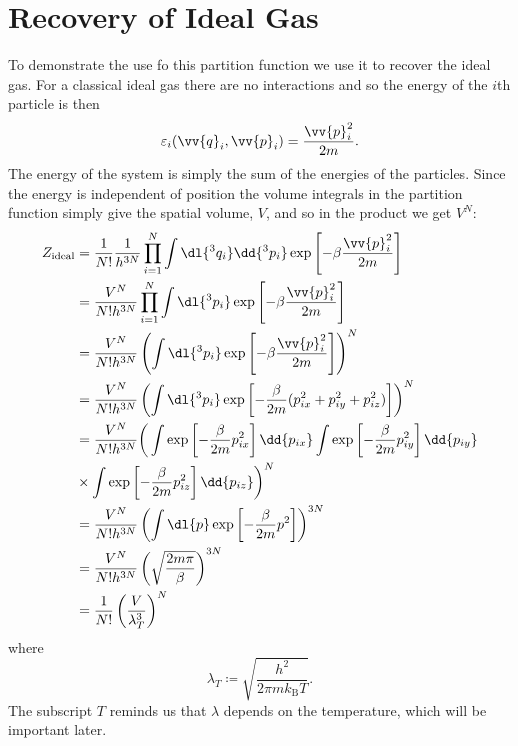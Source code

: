 \documentclass[fleqn]{NotesClass}
\newcommand*{\boltzmann}{k_{\mathrm{B}}}
\begin{document}
    \section{Recovery of Ideal Gas}
    To demonstrate the use fo this partition function we use it to recover the ideal gas.
    For a classical ideal gas there are no interactions and so the energy of the \(i\)th particle is then
    \begin{equation}
        \varepsilon_i(\vv{q}_i, \vv{p}_i) = \frac{\vv{p}_i^2}{2m}.
    \end{equation}
    The energy of the system is simply the sum of the energies of the particles.
    Since the energy is independent of position the volume integrals in the partition function simply give the spatial volume, \(V\), and so in the product we get \(V^N\):
    \begin{align}
        Z_{\mathrm{ideal}} &= \frac{1}{N!} \frac{1}{h^{3N}} \prod_{i = 1}^{N} \int \dl{^3q_i} \dd{^3p_i} \exp\left[ -\beta\frac{\vv{p}_i^2}{2m} \right]\\
        &= \frac{V^N}{N! h^{3N}} \prod_{i = 1}^{N} \int \dl{^3p_i} \exp\left[ -\beta\frac{\vv{p}_i^2}{2m} \right]\\
        &= \frac{V^N}{N! h^{3N}} \left( \int \dl{^3p_i} \exp\left[ -\beta\frac{\vv{p}_i^2}{2m} \right] \right)^N\\
        &= \frac{V^N}{N! h^{3N}} \left( \int \dl{^3p_i} \exp\left[ -\frac{\beta}{2m}(p_{ix}^2 + p_{iy}^2 + p_{iz}^2) \right] \right)^N\\
        &= \frac{V^N}{N! h^{3N}} \bigg ( \int \exp\left[ -\frac{\beta}{2m}p_{ix}^2 \right] \dd{p_{ix}} \int \exp\left[ -\frac{\beta}{2m}p_{iy}^2 \right] \dd{p_{iy}}\\
        &\times \int \exp\left[ -\frac{\beta}{2m}p_{iz}^2 \right] \dd{p_{iz}} \bigg)^N\\
        &= \frac{V^N}{N! h^{3N}} \left( \int \dl{p} \exp\left[ -\frac{\beta}{2m}p^2 \right] \right)^{3N}\\
        &= \frac{V^N}{N! h^{3N}} \left( \sqrt{\frac{2m\pi}{\beta}} \right)^{3N}\\
        &= \frac{1}{N!} \left( \frac{V}{\lambda_{T}^3} \right)^N
    \end{align}
    where
    \begin{equation}
        \lambda_T \coloneqq \sqrt{\frac{h^2}{2\pi m\boltzmann T}}.
    \end{equation}
    The subscript \(T\) reminds us that \(\lambda\) depends on the temperature, which will be important later.
    
\end{document}
